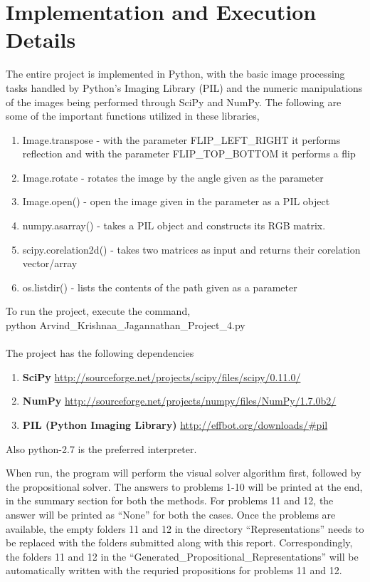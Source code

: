 \documentclass[10pt, letter]{article}
\begin{document}
\section{Implementation and Execution Details}

The entire project is implemented in Python, with the basic image processing tasks handled by Python's Imaging Library (PIL) and the numeric manipulations of the images being performed through SciPy and NumPy. The following are some of the important functions utilized in these libraries,
\begin{enumerate}
	\item Image.transpose - with the parameter FLIP\_LEFT\_RIGHT it performs reflection and with the parameter FLIP\_TOP\_BOTTOM it performs a flip
	\item Image.rotate - rotates the image by the angle given as the parameter
	\item Image.open() - open the image given in the parameter as a PIL object
	\item numpy.asarray() - takes a PIL object and constructs its RGB matrix.
	\item scipy.corelation2d() - takes two matrices as input and returns their corelation vector/array
	\item os.listdir() - lists the contents of the path given as a parameter
\end{enumerate}
To run the project, execute the command, \\
	\hspace*{3cm} python Arvind\_Krishnaa\_Jagannathan\_Project\_4.py \\ \\
The project has the following dependencies
\begin{enumerate}
\item \textbf{SciPy}	\url{http://sourceforge.net/projects/scipy/files/scipy/0.11.0/}
\item \textbf{NumPy}	\url{http://sourceforge.net/projects/numpy/files/NumPy/1.7.0b2/}
\item \textbf{PIL (Python Imaging Library)}	\url{http://effbot.org/downloads/\#pil}
\end{enumerate}
Also python-2.7 is the preferred interpreter.

When run, the program will perform the visual solver algorithm first, followed by the propositional solver. The answers to problems 1-10 will be printed at the end, in the summary section for both the methods. For problems 11 and 12, the answer will be printed as ``None'' for both the cases. Once the problems are available, the empty folders 11 and 12 in the directory ``Representations'' needs to be replaced with the folders submitted along with this report. Correspondingly, the folders 11 and 12 in the ``Generated\_Propositional\_Representations'' will be automatically written with the requried propositions for problems 11 and 12.
\end{document}
